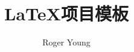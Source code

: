 \documentclass{ctexbook}
\newcommand{\documentTitle}
    {\texorpdfstring{\LaTeX 项目模板}{LaTeX项目模板}}
\newcommand{\documentAuthor}{Roger Young}
\begin{document}
\title{\documentTitle}
\author{\documentAuthor}

\maketitle
\tableofcontents
\end{document}
